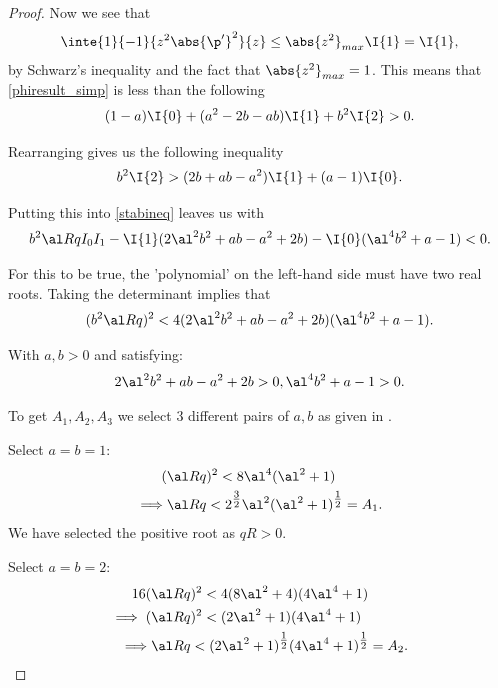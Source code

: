 \begin{proof}
    Now we see that 
    \begin{equation}
        \inte{1}{-1}{z^2 \abs{\p'}^2}{z} \leq \abs{z^2}_{max} \I{1} = \I{1},
    \end{equation}
    by Schwarz's inequality and the fact that $ \abs{z^2}_{max} = 1 $. This means that \eqref{phiresult_simp} is less than the following
    \begin{equation}
        (1 - a) \I{0} + (a^2 - 2b - ab) \I{1} + b^2 \I{2} > 0. 
    \end{equation}

    Rearranging gives us the following inequality
    \begin{equation}
        b^2 \I{2} > (2b + ab - a^2) \I{1} + (a - 1) \I{0}.
        \label{phiineq}
    \end{equation}

    Putting this into \eqref{stabineq} leaves us with
    \begin{equation}
        b^2 \al R q I_0 I_1 - \I{1} (2 \al^2 b^2 + ab - a^2 + 2b) - \I{0} (\al^4 b^2 + a - 1) < 0.
    \end{equation}

    For this to be true, the 'polynomial' on the left-hand side must have two real roots. Taking the determinant implies that
    \begin{equation}
        (b^2 \al R q)^2 < 4(2 \al^2 b^2 + ab - a^2 + 2b)(\al^4 b^2 + a - 1).
    \end{equation}

    With $ a, b > 0$ and satisfying:
    \begin{gather}
        2 \al^2 b^2 + ab - a^2 + 2b > 0, \al^4 b^2 + a - 1 > 0.
    \end{gather}

    To get $ A_1, A_2, A_3 $ we select 3 different pairs of $ a, b $ as given in \citet{synge1938hydrodynamical}.

    Select $ a = b = 1$:
    \begin{align}
        (&\al R q)^2 < 8 \al^4 (\al^2 + 1) \nonumber\\
        \implies &\al R q < 2^{\tfrac{3}{2}} \al^2 (\al^2 + 1)^{\tfrac{1}{2}} = A_1.
    \end{align}
    We have selected the positive root as $ q R > 0$.

    Select $ a = b = 2 $:
    \begin{align}
        16 (&\al R q)^2 < 4 (8 \al^2 + 4)( 4 \al^4 + 1) \nonumber\\
        \implies (&\al R q)^2 < (2 \al^2 + 1)(4 \al^4 + 1) \nonumber\\
        \implies &\al R q < (2 \al^2 + 1)^{\tfrac{1}{2}}(4 \al^4 + 1)^{\tfrac{1}{2}} = A_2.
    \end{align}


\end{proof}
